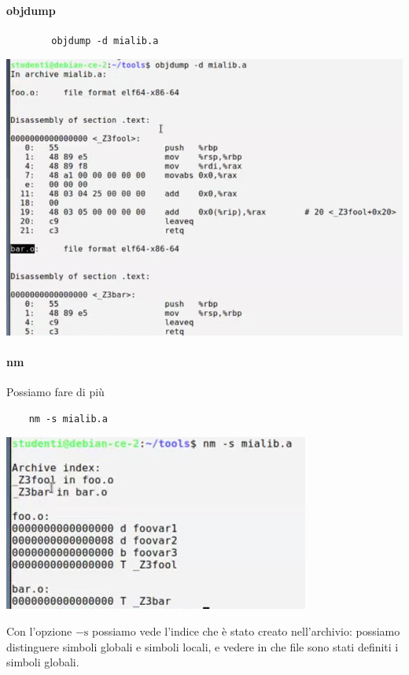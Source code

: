 \begin{multicols}{2}
	\paragraph{objdump}
	\begin{verbatim}
		objdump -d mialib.a
	\end{verbatim}
	\begin{center}
		\includegraphics[scale=0.65]{img/62.png}
	\end{center}
\end{multicols}
\paragraph{nm} Possiamo fare di più
\begin{verbatim}
	nm -s mialib.a
\end{verbatim}
\begin{center}
	\includegraphics{img/63.png}
\end{center}
Con l'opzione $-\text{s}$ possiamo vede l'indice che è stato creato nell'archivio: possiamo distinguere simboli globali e simboli locali, e vedere in che file sono stati definiti i simboli globali.

